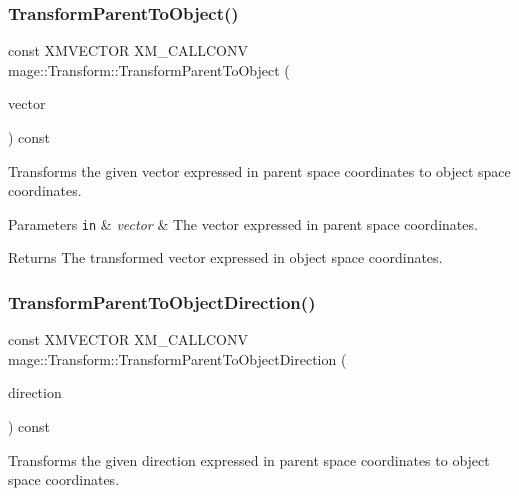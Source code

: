 \subsubsection{\texorpdfstring{Transform\+Parent\+To\+Object()}{TransformParentToObject()}}
{\footnotesize\ttfamily const X\+M\+V\+E\+C\+T\+OR X\+M\+\_\+\+C\+A\+L\+L\+C\+O\+NV mage\+::\+Transform\+::\+Transform\+Parent\+To\+Object (\begin{DoxyParamCaption}\item[{F\+X\+M\+V\+E\+C\+T\+OR}]{vector }\end{DoxyParamCaption}) const\hspace{0.3cm}{\ttfamily [noexcept]}}

Transforms the given vector expressed in parent space coordinates to object space coordinates.


\begin{DoxyParams}[1]{Parameters}
\mbox{\tt in}  & {\em vector} & The vector expressed in parent space coordinates. \\
\hline
\end{DoxyParams}
\begin{DoxyReturn}{Returns}
The transformed vector expressed in object space coordinates. 
\end{DoxyReturn}
\hypertarget{classmage_1_1_transform_a0f84d13bf0016a6c98d84ccf0d357b50}{}\label{classmage_1_1_transform_a0f84d13bf0016a6c98d84ccf0d357b50} 
\subsubsection{\texorpdfstring{Transform\+Parent\+To\+Object\+Direction()}{TransformParentToObjectDirection()}}
{\footnotesize\ttfamily const X\+M\+V\+E\+C\+T\+OR X\+M\+\_\+\+C\+A\+L\+L\+C\+O\+NV mage\+::\+Transform\+::\+Transform\+Parent\+To\+Object\+Direction (\begin{DoxyParamCaption}\item[{F\+X\+M\+V\+E\+C\+T\+OR}]{direction }\end{DoxyParamCaption}) const\hspace{0.3cm}{\ttfamily [noexcept]}}

Transforms the given direction expressed in parent space coordinates to object space coordinates.


